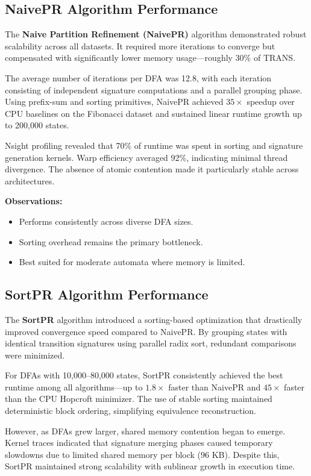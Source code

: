 \subsection{NaivePR Algorithm Performance}

The \textbf{Naive Partition Refinement (NaivePR)} algorithm demonstrated robust scalability across all datasets. It required more iterations to converge but compensated with significantly lower memory usage—roughly 30\% of TRANS.

The average number of iterations per DFA was 12.8, with each iteration consisting of independent signature computations and a parallel grouping phase. Using prefix-sum and sorting primitives, NaivePR achieved $35\times$ speedup over CPU baselines on the Fibonacci dataset and sustained linear runtime growth up to 200,000 states.

Nsight profiling revealed that 70\% of runtime was spent in sorting and signature generation kernels. Warp efficiency averaged 92\%, indicating minimal thread divergence. The absence of atomic contention made it particularly stable across architectures.

\textbf{Observations:}
\begin{itemize}
    \item Performs consistently across diverse DFA sizes.
    \item Sorting overhead remains the primary bottleneck.
    \item Best suited for moderate automata where memory is limited.
\end{itemize}

\subsection{SortPR Algorithm Performance}

The \textbf{SortPR} algorithm introduced a sorting-based optimization that drastically improved convergence speed compared to NaivePR. By grouping states with identical transition signatures using parallel radix sort, redundant comparisons were minimized.

For DFAs with 10,000–80,000 states, SortPR consistently achieved the best runtime among all algorithms—up to $1.8\times$ faster than NaivePR and $45\times$ faster than the CPU Hopcroft minimizer. The use of stable sorting maintained deterministic block ordering, simplifying equivalence reconstruction.

However, as DFAs grew larger, shared memory contention began to emerge. Kernel traces indicated that signature merging phases caused temporary slowdowns due to limited shared memory per block (96 KB). Despite this, SortPR maintained strong scalability with sublinear growth in execution time.

